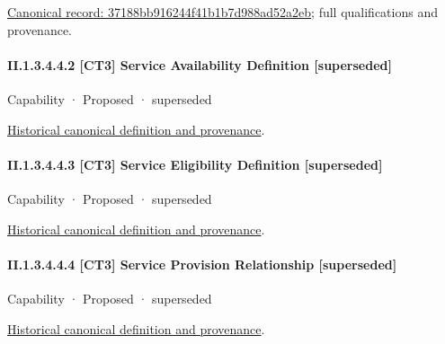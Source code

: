 {\footnotesize \href{../../../../continuum/strategy/capability/feature/37188bb916244f41b1b7d988ad52a2eb.md}{Canonical record: 37188bb916244f41b1b7d988ad52a2eb}; full qualifications and provenance.}\par
\paragraph*{II.1.3.4.4.2 [CT3] Service Availability Definition [superseded]}
\label{navigation:II.1.3.4.4.2}

\label{element:9e5329a42f964199b4b0a87ab1cacc2e}
{\small Capability · Proposed · superseded}\par
\href{../../../../continuum/strategy/capability/9e5329a42f964199b4b0a87ab1cacc2e.md}{Historical canonical definition and provenance}.\par
\paragraph*{II.1.3.4.4.3 [CT3] Service Eligibility Definition [superseded]}
\label{navigation:II.1.3.4.4.3}

\label{element:8a3f29e5948141e2a3d0c72539759daf}
{\small Capability · Proposed · superseded}\par
\href{../../../../continuum/strategy/capability/8a3f29e5948141e2a3d0c72539759daf.md}{Historical canonical definition and provenance}.\par
\paragraph*{II.1.3.4.4.4 [CT3] Service Provision Relationship [superseded]}
\label{navigation:II.1.3.4.4.4}

\label{element:718ebe1fa8d44ad9a6632a5932277a8e}
{\small Capability · Proposed · superseded}\par
\href{../../../../continuum/strategy/capability/718ebe1fa8d44ad9a6632a5932277a8e.md}{Historical canonical definition and provenance}.\par
